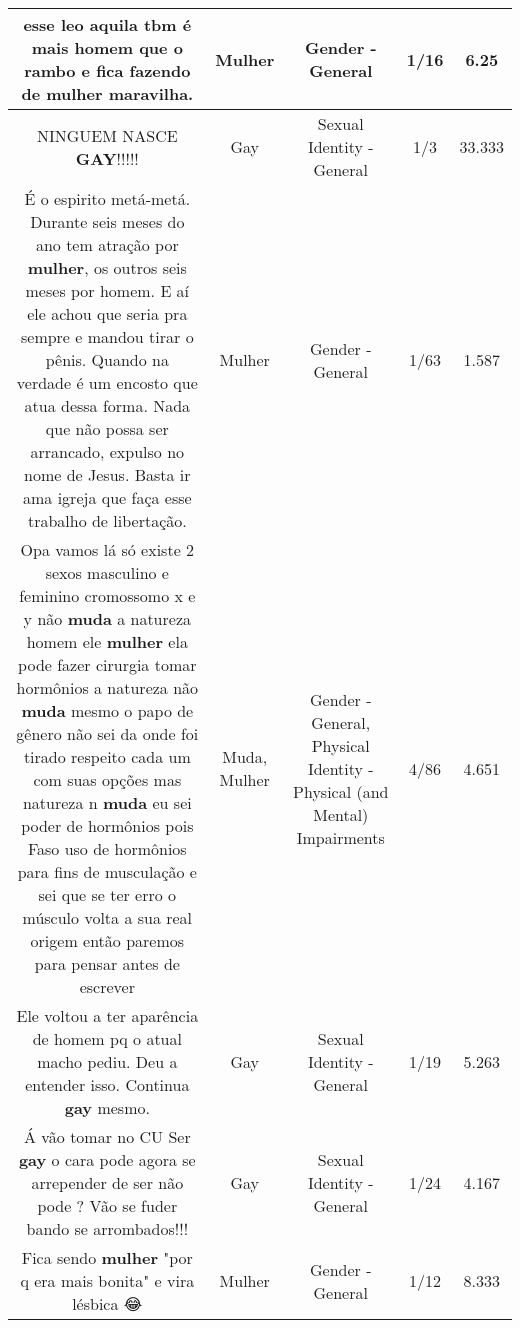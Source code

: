\documentclass[11pt]{article}
\newlength\mylength
\begin{document}
\begin{center}
\begin{longtable}{|C{.65\mylength}|C{.30\mylength}|C{.12\mylength}|C{.12\mylength}|C{.12\mylength}|}
  \small esse leo aquila tbm é mais homem que o rambo e fica fazendo de \textbf{mulher} maravilha.\normalsize   & Mulher & Gender - General & 1/16 & 6.25 \\  \hline
  \small NINGUEM NASCE \textbf{GAY}!!!!!\normalsize   & Gay & Sexual Identity - General & 1/3 & 33.333 \\  \hline
  \small É o espirito metá-metá. Durante seis meses do ano tem atração por \textbf{mulher}, os outros seis meses por homem. E aí ele achou que seria pra sempre e mandou tirar o pênis. Quando na verdade é um encosto que atua dessa forma. Nada que não possa ser arrancado, expulso no nome de Jesus. Basta ir ama igreja que faça esse trabalho de libertação.\normalsize   & Mulher & Gender - General & 1/63 & 1.587 \\  \hline
  \small Opa vamos lá só existe 2 sexos  masculino e feminino cromossomo x e y não \textbf{muda} a natureza homem ele \textbf{mulher} ela pode fazer cirurgia tomar hormônios a natureza não \textbf{muda} mesmo o papo de gênero não sei da onde foi tirado respeito cada um com suas opções mas natureza n \textbf{muda} eu sei poder de hormônios pois Faso uso de hormônios para fins de musculação e sei que se ter erro o músculo volta a sua real origem então paremos para pensar antes de escrever\normalsize   & Muda, Mulher & Gender - General, Physical Identity - Physical (and Mental) Impairments & 4/86 & 4.651 \\  \hline
  \small Ele voltou a ter aparência de homem pq o atual macho pediu. Deu a entender isso. Continua \textbf{gay} mesmo.\normalsize   & Gay & Sexual Identity - General & 1/19 & 5.263 \\  \hline
  \small Á vão tomar no CU Ser \textbf{gay} o cara pode agora se arrepender de ser não pode   ?  Vão se fuder bando se arrombados!!!\normalsize   & Gay & Sexual Identity - General & 1/24 & 4.167 \\  \hline
  \small Fica sendo \textbf{mulher} "por q era mais bonita" e vira lésbica 😂\normalsize   & Mulher & Gender - General & 1/12 & 8.333 \\  \hline

\end{longtable}
\end{center}
\end{document}
